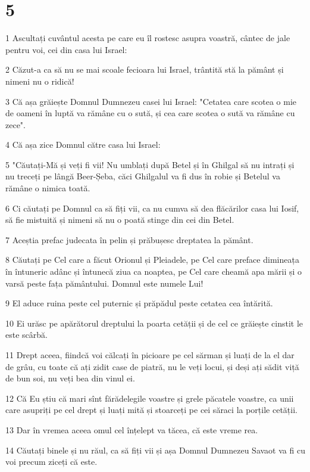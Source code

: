 \chapter{5}

\par 1 Ascultați cuvântul acesta pe care eu îl rostesc asupra voastră, cântec de jale pentru voi, cei din casa lui Israel:
\par 2 Căzut-a ca să nu se mai scoale fecioara lui Israel, trântită stă la pământ și nimeni nu o ridică!
\par 3 Că așa grăiește Domnul Dumnezeu casei lui Israel: "Cetatea care scotea o mie de oameni în luptă va rămâne cu o sută, și cea care scotea o sută va rămâne cu zece".
\par 4 Că așa zice Domnul către casa lui Israel:
\par 5 "Căutați-Mă și veți fi vii! Nu umblați după Betel și în Ghilgal să nu intrați și nu treceți pe lângă Beer-Șeba, căci Ghilgalul va fi dus în robie și Betelul va rămâne o nimica toată.
\par 6 Ci căutați pe Domnul ca să fiți vii, ca nu cumva să dea flăcărilor casa lui Iosif, să fie mistuită și nimeni să nu o poată stinge din cei din Betel.
\par 7 Aceștia prefac judecata în pelin și prăbușesc dreptatea la pământ.
\par 8 Căutați pe Cel care a făcut Orionul și Pleiadele, pe Cel care preface dimineața în întuneric adânc și întunecă ziua ca noaptea, pe Cel care cheamă apa mării și o varsă peste fața pământului. Domnul este numele Lui!
\par 9 El aduce ruina peste cel puternic și prăpădul peste cetatea cea întărită.
\par 10 Ei urăsc pe apărătorul dreptului la poarta cetății și de cel ce grăiește cinstit le este scârbă.
\par 11 Drept aceea, fiindcă voi călcați în picioare pe cel sărman și luați de la el dar de grâu, cu toate că ați zidit case de piatră, nu le veți locui, și deși ați sădit viță de bun soi, nu veți bea din vinul ei.
\par 12 Că Eu știu că mari sînt fărădelegile voastre și grele păcatele voastre, ca unii care asupriți pe cel drept și luați mită și stoarceți pe cei săraci la porțile cetății.
\par 13 Dar în vremea aceea omul cel înțelept va tăcea, că este vreme rea.
\par 14 Căutați binele și nu răul, ca să fiți vii și așa Domnul Dumnezeu Savaot va fi cu voi precum ziceți că este.

